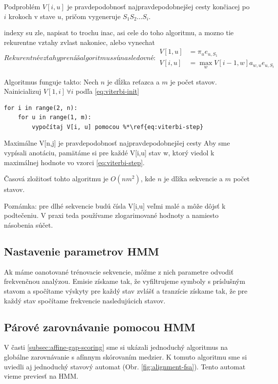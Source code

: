 Podproblém $V[i,u]$ je pravdepodobnosť najpravdepodobnejšej cesty končiacej po $i$ krokoch v stave $u$, pričom vygeneruje $S_1 S_2 \dots S_i$.

\todo indexy su zle, napisat to trochu inac, asi cele do toho algoritmu, a mozno tie rekurentne vztahy zvlast nakoniec, alebo vynechat
\begin{subequations}
Rekurentné vzťahy pre náš algoritmus sú nasledovné:
\begin{align}
        \label{eq:viterbi-init}
        V[1,u] &= \pi_u e_{u,S_1}\\
        \label{eq:viterbi-step}
        V[i,u] &= \max_w V[i-1, w] a_{w,u} e_{u,S_i}
\end{align}
\end{subequations}

Algoritmus funguje takto:
Nech $n$ je dĺžka reťazca a $m$ je počet stavov.
Nainicializuj $V[1,i]\, \forall i$ podľa \ref{eq:viterbi-init}

\begin{lstlisting}
for i in range(2, n):
    for u in range(1, m):
        vypočítaj V[i, u] pomocou %*\ref{eq:viterbi-step}
\end{lstlisting}
Maximálne V[n,j] je pravdepodobnosť najpravdepodobnejšej cesty
Aby sme vypísali anotáciu, pamätáme si pre každé V[i,u] stav w, ktorý viedol k maximálnej hodnote vo vzorci \ref{eq:viterbi-step}.

Časová zložitosť tohto algoritmu je $O(nm^2)$, kde $n$ je dľžka sekvencie a $m$ počet stavov.

Poznámka: pre dlhé sekvencie budú čísla V[i,u] veľmi malé a môže dôjsť k podtečeniu. V praxi teda používame zlogarimované hodnoty a namiesto násobenia súčet.

\subsection{Nastavenie parametrov HMM}
Ak máme oanotované trénovacie sekvencie, môžme z nich parametre odvodiť frekvenčnou analýzou. Emisie získame tak, že vyfiltrujeme symboly s príslušným stavom a spočítame výskyty pre každý stav zvlášť a tranzície získame tak, že pre každý stav spočítame frekvencie nasledujúcich stavov.

\subsection{Párové zarovnávanie pomocou HMM}
V časti \ref{subsec:affine-gap-scoring} sme si ukázali jednoduchý algoritmus na globálne zarovnávanie s afínnym skórovaním medzier. K tomuto algoritmu sme si uviedli aj jednoduchý stavový automat (Obr. \ref{fig:alignment-fsa}). Tento automat vieme previesť na HMM.

